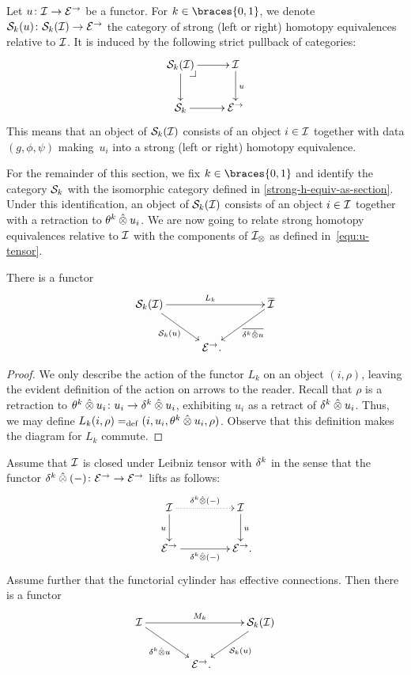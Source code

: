 \documentclass[reqno,10pt,a4paper,oneside,draft]{amsart}
\begin{document}
Let $u \co \cal{I} \to \catE^\to$ be a functor.
For $k \in \braces{0, 1}$, we denote $\cal{S}_k(u) \co \cal{S}_k(\cal{I}) \to \catE^\to$ the category of strong (left or right) homotopy equivalences relative to $\cal{I}$.
It is induced by the following strict pullback of categories:
\[
\xymatrix{
  \cal{S}_k(\cal{I})
  \ar[r]
  \ar[d]
  \pullback{dr}
&
  \cal{I}
  \ar[d]^{u}
\\
  \cal{S}_k
  \ar[r]
&
  \catE^\to
}
\]
This means that an object of $\cal{S}_k(\cal{I})$ consists of an object $i \in \cal{I}$ together with data $(g, \phi, \psi)$ making~$u_i$ into a strong (left or right) homotopy equivalence.

For the remainder of this section, we fix $k \in \braces{0, 1}$ and identify the category $\cal{S}_k$ with the isomorphic category defined in \cref{strong-h-equiv-as-section}.
Under this identification, an object of $\cal{S}_k(\cal{I})$ consists of an object $i \in \cal{I}$ together with a retraction to $\thetak \hatotimes u_i$.
We are now going to relate strong homotopy equivalences relative to $\cal{I}$ with the components of $\cal{I}_\otimes$ as defined in~\eqref{equ:u-tensor}.

\begin{lemma} \label{lem:from-strong-hequiv}
There is a functor
\[
\xymatrix@!C{
  \cal{S}_k(\cal{I})
  \ar[dr]_{\cal{S}_k(u)}
  \ar[rr]^{L_k}
&&
  \overline{\cal{I}}
  \ar[dl]^-{\overline{\kcyl \hatotimes u}}
\\&
  \catE^\to
\rlap{.}}
\]
\end{lemma}

\begin{proof}
We only describe the action of the functor $L_k$ on an object $(i, \rho)$, leaving the evident definition of the action on arrows to the reader.
Recall that $\rho$ is a retraction to $\thetak \hatotimes u_i \co u_i \to \kcyl \hatotimes u_i$, exhibiting $u_i$ as a retract of $\kcyl \hatotimes u_i$.
Thus, we may define $L_k(i, \rho) \defeq (i, u_i, \thetak \hatotimes u_i, \rho)$.
Observe that this definition makes the diagram for $L_k$ commute.
\end{proof}

\begin{lemma} \label{lem:to-strong-hequiv}
Assume that $\cal{I}$ is closed under Leibniz tensor with $\kcyl$ in the sense that the functor $\kcyl \hatotimes (-) \co \catE^\to \to \catE^\to$ lifts as follows:
\begin{equation}
\label{to-strong-hequiv:0}
\begin{gathered}
\xymatrix@C+2em{
  \cal{I}
  \ar[d]_{u}
  \ar@{.>}[r]^{\kcyl \hatotimes (-)}
&
  \cal{I}
  \ar[d]^{u}
\\
  \catE^\to
  \ar[r]_{\kcyl \hatotimes (-)}
&
  \catE^\to
\rlap{.}}
\end{gathered}
\end{equation}
Assume further that the functorial cylinder has effective connections.
Then there is a functor
\[
\xymatrix@!C{
  \cal{I}
  \ar[dr]_{\kcyl \hatotimes u} \ar[rr]^{M_k}
&&
  \cal{S}_k(\cal{I})
  \ar[dl]^{\cal{S}_k(u)}
\\&
   \catE^\to
\rlap{.}}
\]
\end{lemma}
\end{document}
